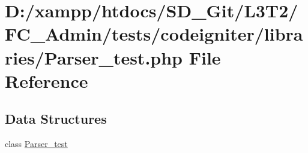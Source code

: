\hypertarget{_parser__test_8php}{}\section{D\+:/xampp/htdocs/\+S\+D\+\_\+\+Git/\+L3\+T2/\+F\+C\+\_\+\+Admin/tests/codeigniter/libraries/\+Parser\+\_\+test.php File Reference}
\label{_parser__test_8php}
\subsection*{Data Structures}
\begin{DoxyCompactItemize}
\item 
class \hyperlink{class_parser__test}{Parser\+\_\+test}
\end{DoxyCompactItemize}
